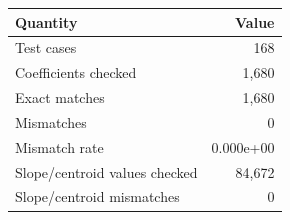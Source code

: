 \begin{tabular}{lr}
\hline
Quantity & Value \\
\hline
Test cases & 168 \\
Coefficients checked & 1,680 \\
Exact matches & 1,680 \\
Mismatches & 0 \\
Mismatch rate & 0.000e+00 \\
Slope/centroid values checked & 84,672 \\
Slope/centroid mismatches & 0 \\
\hline
\end{tabular}
